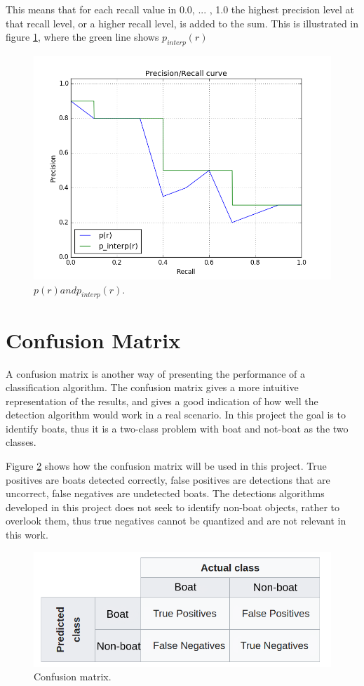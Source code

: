 \noindent
This means that for each recall value in {0.0, ... , 1.0} the highest precision level at that recall level, or a higher recall level, is added to the sum. This is illustrated in figure \ref{fig:p_interp}, where the green line shows $p_{interp}(r)$

\begin{figure}[h!]
    \centering
    \includegraphics[scale=0.5]{fig/p_interp.png}
    \caption{$p(r) and p_{interp}(r)$.}
    \label{fig:p_interp}
\end{figure}

\section{Confusion Matrix}
\label{sec:conf_mat}
A confusion matrix is another way of presenting the performance of a classification algorithm. The confusion matrix gives a more intuitive representation of the results, and gives a good indication of how well the detection algorithm would work in a real scenario. In this project the goal is to identify boats, thus it is a two-class problem with boat and not-boat as the two classes. 

\noindent
Figure \ref{fig:conf_exp} shows how the confusion matrix will be used in this project. True positives are boats detected correctly, false positives are detections that are uncorrect, false negatives are undetected boats. The detections algorithms developed in this project does not seek to identify non-boat objects, rather to overlook them, thus true negatives cannot be quantized and are not relevant in this work.

\begin{figure}[h!]
    \centering
    \includegraphics[width = 0.7 \textwidth]{fig/conf_e.png}
    \caption{Confusion matrix.}
    \label{fig:conf_exp}
\end{figure}

\newpage








\cleardoublepage